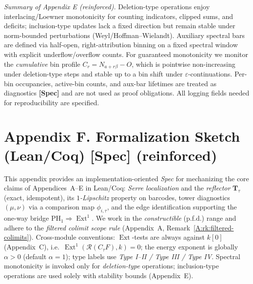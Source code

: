 \documentclass[11pt]{article}
\DeclareMathOperator{\Ext}{Ext}
\numberwithin{equation}{section}
\theoremstyle{definition}
\begin{document}
\medskip
\noindent\emph{Summary of Appendix E (reinforced).}
Deletion-type operations enjoy interlacing/Loewner monotonicity for counting indicators, clipped sums, and deficits; inclusion-type updates lack a fixed direction but remain stable under norm-bounded perturbations (Weyl/Hoffman–Wielandt).
Auxiliary spectral bars are defined via half-open, right-attribution binning on a fixed spectral window with explicit underflow/overflow counts.
For guaranteed monotonicity we monitor the \emph{cumulative} bin profile \(C_r=N_{a+r\beta}-O\), which is pointwise non-increasing under deletion-type steps and stable up to a bin shift under \(\varepsilon\)-continuations.
Per-bin occupancies, active-bin counts, and aux-bar lifetimes are treated as diagnostics \textbf{[Spec]} and are not used as proof obligations.
All logging fields needed for reproducibility are specified.



\section*{Appendix F. Formalization Sketch (Lean/Coq) [Spec] (reinforced)}
{}

This appendix provides an implementation-oriented \emph{Spec} for mechanizing the core claims of
Appendices~A–E in Lean/Coq: \emph{Serre localization} and the \emph{reflector} \(\mathbf{T}_\tau\) (exact, idempotent),
its \emph{$1$-Lipschitz} property on barcodes, tower diagnostics \((\mu,\nu)\) via a comparison map \(\phi_{i,\tau}\),
and the edge identification supporting the one-way bridge \(\mathrm{PH}_1\Rightarrow\Ext^1\).
We work in the \emph{constructible} (p.f.d.) range and adhere to the \emph{filtered colimit scope rule}
(Appendix~A, Remark~\ref{A:rk:filtered-colimits}). Cross-module conventions: \(\Ext\)-tests are always
against \(k[0]\) (Appendix~C), i.e.\ \(\Ext^1(\mathcal{R}(C_\tau F),k)=0\); the energy exponent is globally
\(\alpha>0\) (default \(\alpha=1\)); type labels use \emph{Type I--II / Type III / Type IV}.
Spectral monotonicity is invoked only for \emph{deletion-type} operations; inclusion-type operations are
used solely with stability bounds (Appendix~E).
\end{document}
